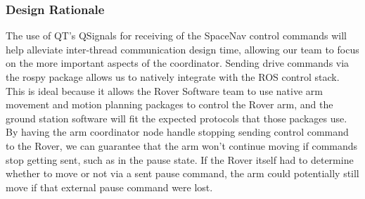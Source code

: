 \subsubsection{Design Rationale}
The use of QT's QSignals for receiving of the SpaceNav control commands will help alleviate inter-thread communication design time, allowing our team to focus on the more important aspects of the coordinator.
Sending drive commands via the rospy package allows us to natively integrate with the ROS control stack.
This is ideal because it allows the Rover Software team to use native arm movement and motion planning packages to control the Rover arm, and the ground station software will fit the expected protocols that those packages use.
By having the arm coordinator node handle stopping sending control command to the Rover, we can guarantee that the arm won't continue moving if commands stop getting sent, such as in the pause state.
If the Rover itself had to determine whether to move or not via a sent pause command, the arm could potentially still move if that external pause command were lost.
